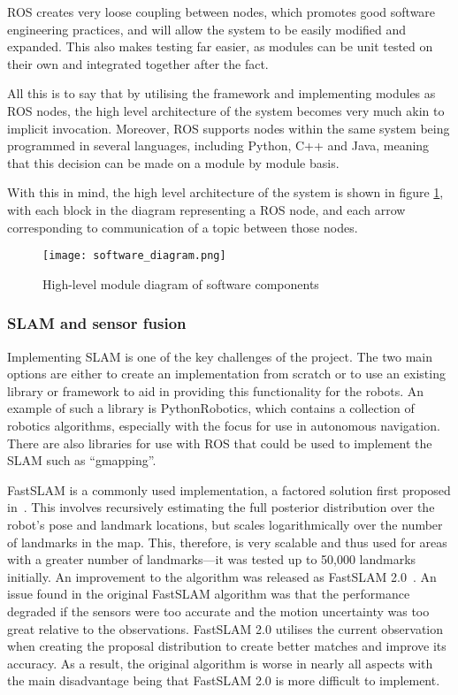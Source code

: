 ROS creates very loose coupling between nodes, which promotes good software
engineering practices, and will allow the system to be easily modified and
expanded. This also makes testing far easier, as modules can be unit tested
on their own and integrated together after the fact.

All this is to say that by utilising the framework and implementing modules
as ROS nodes, the high level architecture of the system becomes very much
akin to implicit invocation. Moreover, ROS supports nodes within the same
system being programmed in several languages, including Python, C++ and Java,
meaning that this decision can be made on a module by module basis.

With this in mind, the high level architecture of the system is shown in
figure \ref{figure:architecture}, with each block in the diagram representing
a ROS node, and each arrow corresponding to communication of a topic between
those nodes.

\begin{figure}[ht]
    \centering
    \texttt{[image: software\_diagram.png]}
    \caption{High-level module diagram of software components}
    \label{figure:architecture}
\end{figure}


\subsubsection{SLAM and sensor fusion}
Implementing SLAM is one of the key challenges of the project. The two main
options are either to create an implementation from scratch or to use an
existing library or framework to aid in providing this functionality for the
robots. An example of such a library is PythonRobotics, which contains a
collection of robotics algorithms, especially with the focus for use in
autonomous navigation. There are also libraries for use with ROS that could be used to implement the SLAM such as ``gmapping''.

FastSLAM is a commonly used implementation, a factored solution first proposed in~\cite{montemerlo2002fastslam}. This involves recursively estimating the full
posterior distribution over the robot's pose and landmark locations, but scales
logarithmically over the number of landmarks in the map. This, therefore, is
very scalable and thus used for areas with a greater number of landmarks---it
was tested up to 50,000 landmarks initially. An improvement to the algorithm was
released as FastSLAM 2.0~\cite{montemerlo2007fastslam}. An issue found in the
original FastSLAM algorithm was that the performance degraded if the sensors were
too accurate and the motion uncertainty was too great relative to the
observations. FastSLAM 2.0 utilises the current observation when creating the
proposal distribution to create better matches and improve its accuracy. As a
result, the original algorithm is worse in nearly all aspects with the main disadvantage being that FastSLAM 2.0 is more difficult to implement.

